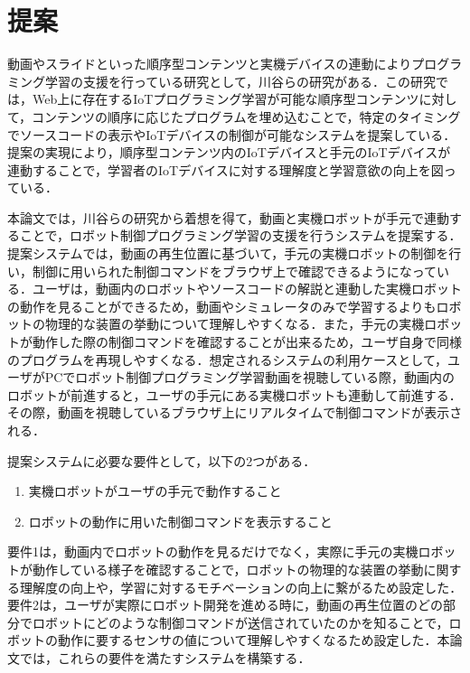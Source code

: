 \documentclass{ujarticle}
\begin{document}
\section{提案}
動画やスライドといった順序型コンテンツと実機デバイスの連動によりプログラミング学習の支援を行っている研究として，川谷らの研究\cite{Kawatani}がある．この研究では，Web上に存在するIoTプログラミング学習が可能な順序型コンテンツに対して，コンテンツの順序に応じたプログラムを埋め込むことで，特定のタイミングでソースコードの表示やIoTデバイスの制御が可能なシステムを提案している．提案の実現により，順序型コンテンツ内のIoTデバイスと手元のIoTデバイスが連動することで，学習者のIoTデバイスに対する理解度と学習意欲の向上を図っている．
\par 本論文では，川谷らの研究から着想を得て，動画と実機ロボットが手元で連動することで，ロボット制御プログラミング学習の支援を行うシステムを提案する．提案システムでは，動画の再生位置に基づいて，手元の実機ロボットの制御を行い，制御に用いられた制御コマンドをブラウザ上で確認できるようになっている．ユーザは，動画内のロボットやソースコードの解説と連動した実機ロボットの動作を見ることができるため，動画やシミュレータのみで学習するよりもロボットの物理的な装置の挙動について理解しやすくなる．また，手元の実機ロボットが動作した際の制御コマンドを確認することが出来るため，ユーザ自身で同様のプログラムを再現しやすくなる．想定されるシステムの利用ケースとして，ユーザがPCでロボット制御プログラミング学習動画を視聴している際，動画内のロボットが前進すると，ユーザの手元にある実機ロボットも連動して前進する．その際，動画を視聴しているブラウザ上にリアルタイムで制御コマンドが表示される．
\par 提案システムに必要な要件として，以下の2つがある．

\begin{enumerate}
  \item 実機ロボットがユーザの手元で動作すること
  \item ロボットの動作に用いた制御コマンドを表示すること
\end{enumerate}

要件1は，動画内でロボットの動作を見るだけでなく，実際に手元の実機ロボットが動作している様子を確認することで，ロボットの物理的な装置の挙動に関する理解度の向上や，学習に対するモチベーションの向上に繋がるため設定した．要件2は，ユーザが実際にロボット開発を進める時に，動画の再生位置のどの部分でロボットにどのような制御コマンドが送信されていたのかを知ることで，ロボットの動作に要するセンサの値について理解しやすくなるため設定した．本論文では，これらの要件を満たすシステムを構築する．
\end{document}
